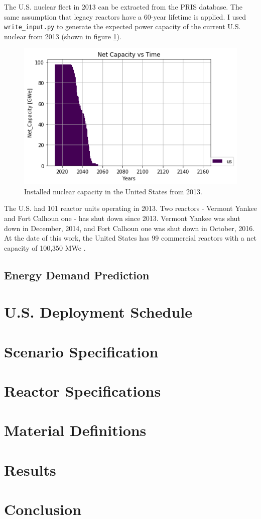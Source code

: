 The U.S. nuclear fleet in 2013 can be extracted from the \gls{PRIS} database.
The same assumption that legacy reactors have a 60-year lifetime is applied.
I used \texttt{write\_input.py} to generate the expected power capacity
of the current U.S. nuclear from 2013 (shown in figure \ref{fig:us_legacy}).

\begin{figure}[htbp!]
	\begin{center}
		\includegraphics[scale=0.6]{./images/us/legacy_power.png}
	\end{center}
	\caption{Installed nuclear capacity in the United States from 2013.}
	\label{fig:us_legacy}
\end{figure}

The U.S. had 101 reactor units operating in 2013. Two reactors -
Vermont Yankee and Fort Calhoun one - has shut down since 2013.
Vermont Yankee was shut down in December, 2014, and Fort
Calhoun one was shut down in October, 2016. At the date of this
work, the United States has 99 commercial reactors with a 
net capacity of 100,350 \gls{MWe} \cite{iaea_nuclear_2017}.


\subsection{Energy Demand Prediction}

\section{U.S. Deployment Schedule}

\section{Scenario Specification}

\section{Reactor Specifications}

\section{Material Definitions}

\section{Results}

\section{Conclusion}